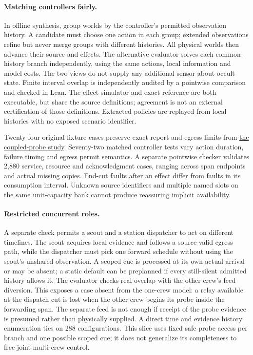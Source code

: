 \documentclass[11pt]{article}
\begin{document}
\paragraph{Matching controllers fairly.}
In offline synthesis, group worlds by the controller's permitted
observation history. A candidate must choose one action in each group;
extended observations refine but never merge groups with different
histories. All physical worlds then advance their source and effects.
The alternative evaluator solves each common-history branch independently,
using the same actions, local information and model costs. The two
views do not supply any additional sensor about occult state. Finite
interval overlap is independently audited by a pointwise comparison and
checked in Lean. The effect simulator and exact reference are both
executable, but share the source definitions; agreement is not an
external certification of those definitions. Extracted policies are
replayed from local histories with no exposed scenario identifier.

Twenty-four original fixture cases preserve exact report and egress
limits from \href{https://github.com/eternal-november/eos-research-programmes/pull/376}{the coupled-probe study}.
Seventy-two matched controller tests vary action duration, failure timing
and egress permit semantics. A separate pointwise checker validates
2,880 service, resource and acknowledgment cases, ranging across
span endpoints and actual missing copies. End-cut faults after an
effect differ from faults in its consumption interval. Unknown source
identifiers and multiple named slots on the same unit-capacity bank
cannot produce reassuring implicit availability.

\paragraph{Restricted concurrent roles.}
A separate check permits a scout and a station dispatcher to act on
different timelines. The scout acquires local evidence and follows a
source-valid egress path, while the dispatcher must pick one forward
schedule without using the scout's unshared observation. A scoped cue
is processed at its own actual arrival or may be absent; a static
default can be preplanned if every still-silent admitted history
allows it. The evaluator checks real overlap with the other crew's
feed diversion. This exposes a case absent from the one-crew model:
a relay available at the dispatch cut is lost when the other crew
begins its probe inside the forwarding span. The separate feed is
not enough if receipt of the probe evidence is presumed rather than
physically supplied. A direct time and evidence history enumeration
ties on 288 configurations. This slice uses fixed safe probe access
per branch and one possible scoped cue; it does not generalize its
completeness to free joint multi-crew control.
\end{document}
